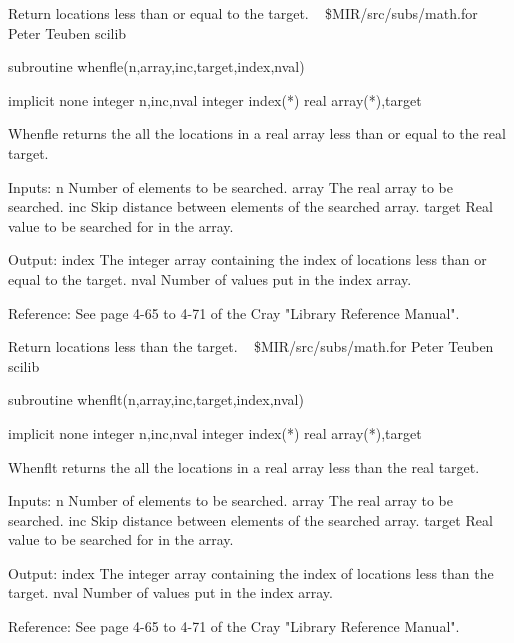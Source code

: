 %
\noindent Return locations less than or equal to the target.
\newline \ 
\newline {} \$MIR/src/subs/math.for
\newline {} Peter Teuben
\newline {} scilib
\par{\tenpoint
{\eightpoint\begintt
        subroutine whenfle(n,array,inc,target,index,nval)

        implicit none
        integer n,inc,nval
        integer index(*)
        real array(*),target

  Whenfle returns the all the locations in a real array less than or equal
  to the real target.

  Inputs:
    n          Number of elements to be searched.
    array      The real array to be searched.
    inc        Skip distance between elements of the searched array.
    target     Real value to be searched for in the array.

  Output:
    index      The integer array containing the index of locations
               less than or equal to the target.
    nval       Number of values put in the index array.

  Reference:
  See page 4-65 to 4-71 of the Cray "Library Reference Manual".
\endtt}
\par}
%
\noindent Return locations less than the target.
\newline \ 
\newline {} \$MIR/src/subs/math.for
\newline {} Peter Teuben
\newline \abox{Keywords:} scilib
\par{\tenpoint
{\eightpoint\begintt
        subroutine whenflt(n,array,inc,target,index,nval)

        implicit none
        integer n,inc,nval
        integer index(*)
        real array(*),target

  Whenflt returns the all the locations in a real array less than the real
  target.

  Inputs:
    n          Number of elements to be searched.
    array      The real array to be searched.
    inc        Skip distance between elements of the searched array.
    target     Real value to be searched for in the array.

  Output:
    index      The integer array containing the index of locations
               less than the target.
    nval       Number of values put in the index array.

  Reference:
  See page 4-65 to 4-71 of the Cray "Library Reference Manual".
\endtt}
\par}
